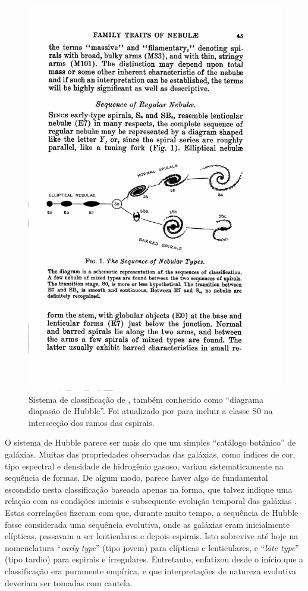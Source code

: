 \begin{figure}
	\includegraphics[width=1.0\textwidth]{figuras/HubbleSequence}
	\caption[Classificação de Hubble.]
	{Sistema de classificação de \citet{hubble1936}, também conhecido como
	``diagrama diapasão de Hubble''. Foi atualizado por
	\citet{Sandage1975} para incluir a classe S0 na intersecção dos
	ramos das espirais.}
	\label{fig:HubbleSequence}
\end{figure}

O sistema de Hubble parece ser mais do que um simples ``catálogo botânico'' de
galáxias. Muitas das propriedades observadas das galáxias, como índices de cor,
tipo espectral e densidade de hidrogênio gasoso, variam sistematicamente na
sequência de formas. De algum modo, parece haver algo de fundamental escondido
nesta classificação baseada apenas na forma, que talvez indique uma relação com
as condições iniciais e subsequente evolução temporal das galáxias
\citep{Sandage1975}. Estas correlações fizeram com que, durante muito tempo, a
sequência de Hubble fosse considerada uma sequência evolutiva, onde as galáxias
eram inicialmente elípticas, passavam a ser lenticulares e depois espirais. Isto
sobrevive até hoje na nomenclatura ``{\em early type}'' (tipo jovem) para
elípticas e lenticulares, e ``{\em late type}'' (tipo tardio) para espirais e
irregulares. Entretanto, \citet{Hubble1927} enfatizou desde o início que a
classificação era puramente empírica, e que interpretações de natureza evolutiva
deveriam ser tomadas com cautela.


